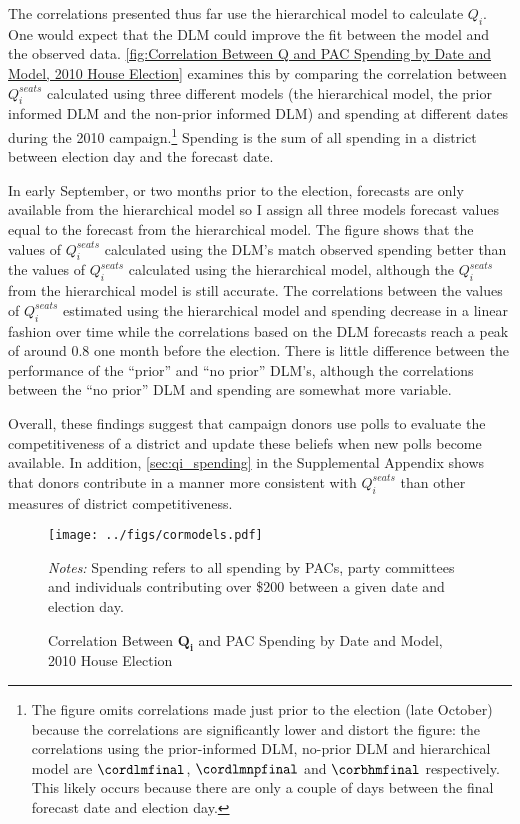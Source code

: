 \documentclass[12pt,final,fleqn]{article}
\theoremstyle{plain}
\begin{document}
The correlations presented thus far use the hierarchical model to calculate $Q_i$. One would expect that the DLM could improve the fit between the model and the observed data. \autoref{fig:Correlation Between Q and PAC Spending by Date and Model, 2010 House Election} examines this by comparing the correlation between $Q_i^{seats}$ calculated using three different models (the hierarchical model, the prior informed DLM and the non-prior informed DLM) and spending at different dates during the 2010 campaign.\footnote{The figure omits correlations made just prior to the election (late October) because the correlations are significantly lower and distort the figure: the correlations using the prior-informed DLM, no-prior DLM and hierarchical model are $\cordlmfinal$, $\cordlmnpfinal$ and $\corbhmfinal$ respectively. This likely occurs because there are only a couple of days between the final forecast date and election day.} Spending is the sum of all spending in a district between election day and the forecast date.

In early September, or two months prior to the election, forecasts are only available from the hierarchical model so I assign all three models forecast values equal to the forecast from the hierarchical model. The figure shows that the values of $Q_i^{seats}$ calculated using the DLM's match observed spending better than the values of $Q_i^{seats}$ calculated using the hierarchical model, although the $Q_i^{seats}$ from the hierarchical model is still accurate. The correlations between the values of $Q_i^{seats}$ estimated using the hierarchical model and spending decrease in a linear fashion over time while the correlations based on the DLM forecasts reach a peak of around 0.8 one month before the election.  There is little difference between the performance of the ``prior'' and ``no prior'' DLM's, although the correlations between the ``no prior'' DLM and spending are somewhat more variable. 

Overall, these findings suggest that campaign donors use polls to evaluate the competitiveness of a district and update these beliefs when new polls become available. In addition, \autoref*{sec:qi_spending} in the Supplemental Appendix shows that donors contribute in a manner more consistent with $Q_i^{seats}$ than other measures of district competitiveness. 

\begin{figure}[!htb]
\texttt{[image: ../figs/cormodels.pdf]}
\vspace{.5cm}
\caption{Correlation Between $\mathbf{Q_i}$ and PAC Spending by Date and Model, 2010 House Election}
\label{fig:Correlation Between Q and PAC Spending by Date and Model, 2010 House Election}
\begin{minipage}{\linewidth}
\footnotesize
\emph{Notes:} Spending refers to all spending by PACs, party committees and individuals contributing over \$200 between a given date and election day.
\end{minipage}
\end{figure}
\end{document}

